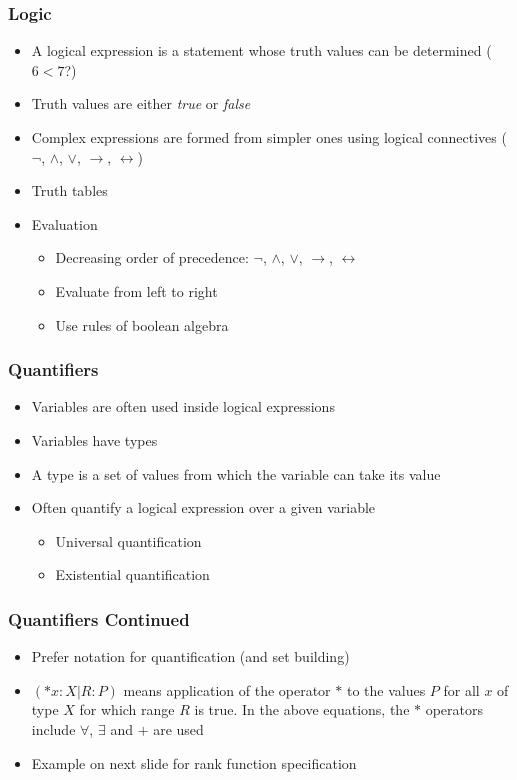 \documentclass[t,12pt,numbers,fleqn]{beamer}
\begin{document}

\begin{frame}
\frametitle{Logic}
\begin{itemize}
\item A logical expression is a statement whose truth values can be
  determined ($6 < 7$?)
\item Truth values are either \emph{true} or \emph{false}
\item Complex expressions are formed from simpler ones using logical
  connectives ($\neg$, $\wedge$, $\vee$, $\rightarrow$,
  $\leftrightarrow$)
\item Truth tables
\item Evaluation
\begin{itemize}
\item Decreasing order of precedence: $\neg$, $\wedge$, $\vee$,
$\rightarrow$, $\leftrightarrow$
\item Evaluate from left to right
\item Use rules of boolean algebra
\end{itemize}
\end{itemize}
\end{frame}


\begin{frame}
\frametitle{Quantifiers}
\begin{itemize}
\item Variables are often used inside logical expressions
\item Variables have types
\item A type is a set of values from which the variable can take its value
\item Often quantify a logical expression over a given variable
\begin{itemize}
\item Universal quantification
\item Existential quantification
\end{itemize}
\end{itemize}
\end{frame}


\begin{frame}
\frametitle{Quantifiers Continued}

\begin{itemize}
\item Prefer \cite[p.\ 143]{GriesAndSchneider1993} notation for quantification
  (and set building)
\item $(*x: X | R : P)$ means application of the operator $*$ to the values $P$ for
all $x$ of type $X$ for which range $R$ is true.  In the above equations, the
$*$ operators include $\forall$, $\exists$ and $+$ are used
\item Example on next slide for rank function specification
\end{itemize}

\end{frame}
\end{document}
